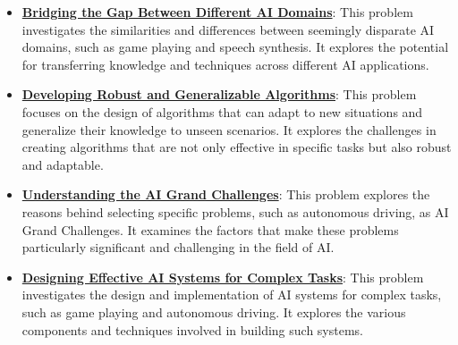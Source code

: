 \documentclass{article}%
\begin{document}
\begin{itemize}[leftmargin=*]
\item \href{\url{https://purdue.brightspace.com/d2l/common/assets/pdfjs-d2l-dist/1.0.14-legacy/web/viewer.html?file=\%252Fcontent\%252Fenforced\%252F1095467-wl.202510.CS.24300.001\%252F02L2-Intro.pdf\%253Fou\%253D1095467\&lang=en-us\&container=d2l-fileviewer-rendered-pdf\&fullscreen=d2l-fileviewer-rendered-pdf-dialog\&height=667}#page=31}{\textbf{Bridging the Gap Between Different AI Domains}}: This problem investigates the similarities and differences between seemingly disparate AI domains, such as game playing and speech synthesis. It explores the potential for transferring knowledge and techniques across different AI applications.%
\item \href{\url{https://purdue.brightspace.com/d2l/common/assets/pdfjs-d2l-dist/1.0.14-legacy/web/viewer.html?file=\%252Fcontent\%252Fenforced\%252F1095467-wl.202510.CS.24300.001\%252F02L2-Intro.pdf\%253Fou\%253D1095467\&lang=en-us\&container=d2l-fileviewer-rendered-pdf\&fullscreen=d2l-fileviewer-rendered-pdf-dialog\&height=667}#page=36}{\textbf{Developing Robust and Generalizable Algorithms}}: This problem focuses on the design of algorithms that can adapt to new situations and generalize their knowledge to unseen scenarios. It explores the challenges in creating algorithms that are not only effective in specific tasks but also robust and adaptable.%
\item \href{\url{https://purdue.brightspace.com/d2l/common/assets/pdfjs-d2l-dist/1.0.14-legacy/web/viewer.html?file=\%252Fcontent\%252Fenforced\%252F1095467-wl.202510.CS.24300.001\%252F02L2-Intro.pdf\%253Fou\%253D1095467\&lang=en-us\&container=d2l-fileviewer-rendered-pdf\&fullscreen=d2l-fileviewer-rendered-pdf-dialog\&height=667}#page=43}{\textbf{Understanding the AI Grand Challenges}}: This problem explores the reasons behind selecting specific problems, such as autonomous driving, as AI Grand Challenges. It examines the factors that make these problems particularly significant and challenging in the field of AI.%
\item \href{\url{https://purdue.brightspace.com/d2l/common/assets/pdfjs-d2l-dist/1.0.14-legacy/web/viewer.html?file=\%252Fcontent\%252Fenforced\%252F1095467-wl.202510.CS.24300.001\%252F02L2-Intro.pdf\%253Fou\%253D1095467\&lang=en-us\&container=d2l-fileviewer-rendered-pdf\&fullscreen=d2l-fileviewer-rendered-pdf-dialog\&height=667}#page=47}{\textbf{Designing Effective AI Systems for Complex Tasks}}: This problem investigates the design and implementation of AI systems for complex tasks, such as game playing and autonomous driving. It explores the various components and techniques involved in building such systems.%
\end{itemize}%
\end{document}
